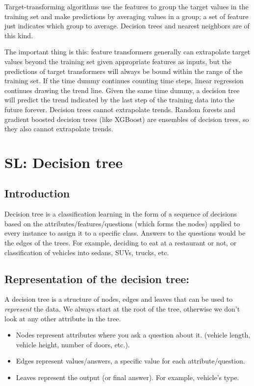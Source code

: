 \documentclass[12pt]{report}
\begin{document}
Target-transforming algorithms use the features to group the target values in the training set and make predictions by averaging values in a group; a set of feature just indicates which group to average. Decision trees and nearest neighbors are of this kind.

The important thing is this: feature transformers generally can extrapolate target values beyond the training set given appropriate features as inputs, but the predictions of target transformers will always be bound within the range of the training set. If the time dummy continues counting time steps, linear regression continues drawing the trend line. Given the same time dummy, a decision tree will predict the trend indicated by the last step of the training data into the future forever. Decision trees cannot extrapolate trends. Random forests and gradient boosted decision trees (like XGBoost) are ensembles of decision trees, so they also cannot extrapolate trends.

\section{SL: Decision tree}

\subsection{Introduction}

Decision tree is a classification learning in the form of a sequence of decisions based on the attributes/features/questions (which forms the nodes) applied to every instance to assign it to a specific class. Answers to the questions would be the edges of the trees.
For example, deciding to eat at a restaurant or not, or classification of vehicles into sedans, SUVs, trucks, etc.

\subsection{Representation of the decision tree:}

A decision tree is a structure of nodes, edges and leaves that can be used to \textit{represent} the data. We always start at the root of the tree, otherwise we don't look at any other attribute in the tree.
\begin{itemize}
\item Nodes represent attributes where you ask a question about it. (vehicle length, vehicle height, number of doors, etc.).
\item Edges represent values/answers, a specific value for each attribute/question.
\item Leaves represent the output (or final answer). For example, vehicle’s type.
\end{itemize}
\end{document}
